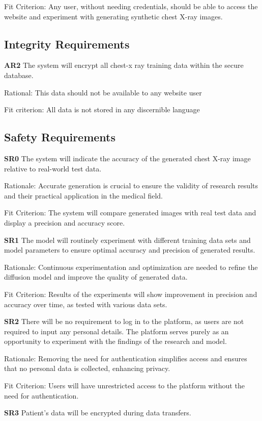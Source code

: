 \documentclass{article}
\begin{document}
Fit Criterion: Any user, without needing credentials, should be able to access the website and
experiment with generating synthetic chest X-ray images.

\subsection{Integrity Requirements}
\textbf{AR2} The system will encrypt all chest-x ray training data within the secure database.

Rational: This data should not be available to any website user

Fit criterion: All data is not stored in any discernible language

\subsection{Safety Requirements}
\textbf{SR0} The system will indicate the accuracy of the generated chest X-ray image relative to
real-world test data.

Rationale: Accurate generation is crucial to ensure the validity of research results and their
practical application in the medical field.

Fit Criterion: The system will compare generated images with real test data and display a
precision and accuracy score.

\textbf{SR1} The model will routinely experiment with different training data sets and model
parameters to ensure optimal accuracy and precision of generated results.

Rationale: Continuous experimentation and optimization are needed to refine the diffusion model
and improve the quality of generated data.

Fit Criterion: Results of the experiments will show improvement in precision and accuracy over
time, as tested with various data sets.

\textbf{SR2} There will be no requirement to log in to the platform, as users are not required to
input any personal details. The platform serves purely as an opportunity to experiment with the
findings of the research and model.

Rationale: Removing the need for authentication simplifies access and ensures that no personal
data is collected, enhancing privacy.

Fit Criterion: Users will have unrestricted access to the platform without the need for
authentication.

\textbf{SR3} Patient's data will be encrypted during data transfers.
\end{document}
